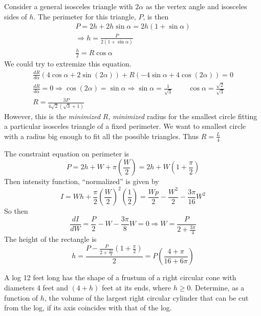 \documentclass[twoside]{amsart}
\theoremstyle{plain}
\theoremstyle{definition}
\newcommand{\exercisehead}[1]
  {\smallskip
   \noindent{\small\bf Exercise #1.}}
\begin{document}
\begin{enumerate}
Consider a general isosceles triangle with $2\alpha$ as the vertex angle and isosceles sides of $h$.  The perimeter for this triangle, $P$, is then
\[
\begin{gathered}
  P = 2h + 2h \sin{\alpha} = 2h (1 + \sin{\alpha}) \\
  \Longrightarrow h = \frac{P}{ 2 ( 1+ \sin{\alpha}) } \\
  \frac{h}{2} = R\cos{\alpha}
\end{gathered}
\]
We could try to extremize this equation.
\[
\begin{gathered}
  \frac{ dR}{d\alpha} (4 \cos{\alpha} + 2 \sin{(2\alpha)} ) + R ( -4 \sin{\alpha} + 4 \cos{ (2\alpha) } ) = 0 \\
  \frac{dR}{d\alpha } = 0  \Longrightarrow \cos{(2\alpha)} = \sin{\alpha} \Longrightarrow \sin{\alpha} = \frac{1}{\sqrt{3}} \, \quad \quad \cos{\alpha} =\frac{\sqrt{2}}{\sqrt{3}} \\
   R = \frac{ 3P}{ 4 \sqrt{2} ( \sqrt{3} + 1 ) } 
\end{gathered}
\]
However, this is the \emph{minimized} $R$, \emph{minimized} radius for the smallest circle fitting a particular isosceles triangle of a fixed perimeter.  We want to smallest circle with a radius big enough to fit all the possible triangles.  Thus $R = \frac{L}{4}$
\end{enumerate}

\exercisehead{23} The constraint equation on perimeter is
\[
P = 2 h + W + \pi \left( \frac{W}{2} \right) = 2 h + W (1 + \frac{\pi}{2} )
\]
Then intensity function, ``normalized'' is given by
\[
I = Wh + \frac{ \pi}{2} \left( \frac{W}{2} \right)^2 \left( \frac{1}{2} \right) = \frac{ W p }{2} - \frac{W^2}{2} - \frac{3\pi}{16} W^2 
\]
So then 
\[
\frac{dI}{dW} = \frac{P}{2} - W - \frac{3\pi}{8} W = 0 \Longrightarrow W = \boxed{ \frac{ P}{ 2 + \frac{3\pi}{4} } }
\]
The height of the rectangle is
\[
h = \frac{ P - \frac{ P}{ 2+ \frac{3\pi}{4} } ( 1+ \frac{\pi}{2} ) }{ 2 } = P \left( \frac{ 4+\pi}{ 16 + 6 \pi } \right)
\]

\exercisehead{24} A log 12 feet long has the shape of a frustum of a right circular cone with diameters 4 feet and $(4+h)$ feet at its ends, where $h \geq 0$.  Determine, as a function of $h$, the volume of the largest right circular cylinder that can be cut from the log, if its axis coincides with that of the log.  
\end{document}
